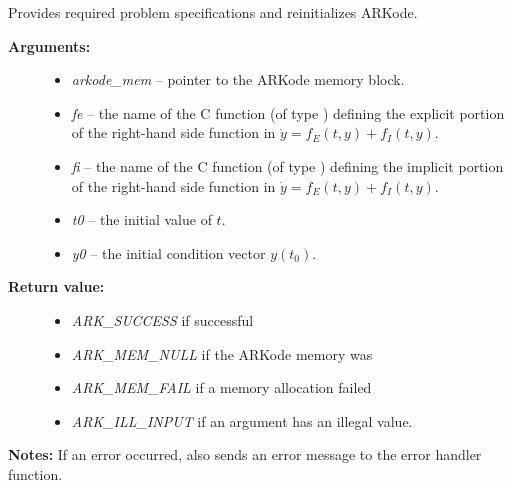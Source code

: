 \documentclass[letterpaper,10pt,english]{sphinxmanual}
\begin{document}
\begin{fulllineitems}
\label{c_interface/User_callable:c.ARKodeReInit}
Provides required problem specifications and reinitializes ARKode.
\begin{description}
\item[{\textbf{Arguments:}}] \leavevmode\begin{itemize}
\item {} 
\emph{arkode\_mem} -- pointer to the ARKode memory block.

\item {} 
\emph{fe} -- the name of the C function (of type {\hyperref[c_interface/User_supplied:c.ARKRhsFn]{\emph{}}})
defining the explicit portion of the right-hand side function in
\(\dot{y} = f_E(t,y) + f_I(t,y)\).

\item {} 
\emph{fi} -- the name of the C function (of type {\hyperref[c_interface/User_supplied:c.ARKRhsFn]{\emph{}}})
defining the implicit portion of the right-hand side function in
\(\dot{y} = f_E(t,y) + f_I(t,y)\).

\item {} 
\emph{t0} -- the initial value of \(t\).

\item {} 
\emph{y0} -- the initial condition vector \(y(t_0)\).

\end{itemize}

\item[{\textbf{Return value:}}] \leavevmode\begin{itemize}
\item {} 
\emph{ARK\_SUCCESS} if successful

\item {} 
\emph{ARK\_MEM\_NULL}  if the ARKode memory was 

\item {} 
\emph{ARK\_MEM\_FAIL}  if a memory allocation failed

\item {} 
\emph{ARK\_ILL\_INPUT} if an argument has an illegal value.

\end{itemize}

\end{description}

\textbf{Notes:} If an error occurred, {\hyperref[c_interface/User_callable:c.ARKodeReInit]{\emph{}}} also
sends an error message to the error handler function.

\end{fulllineitems}
\end{document}
